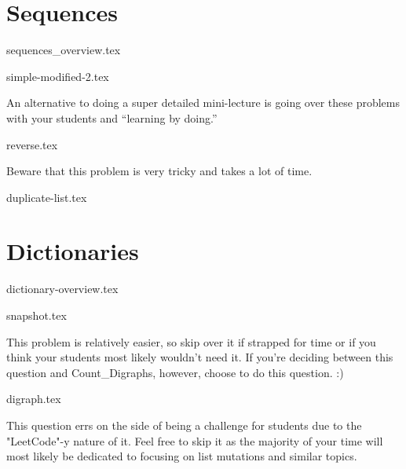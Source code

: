 \documentclass{exam}
\begin{document}
\section{Sequences}
{sequences_overview.tex}
\begin{questions}
    {simple-modified-2.tex}
    \begin{questionmeta}
        An alternative to doing a super detailed mini-lecture is going over these problems with your students and ``learning by doing.'' 
    \end{questionmeta}
    {reverse.tex}
    \begin{questionmeta}
        Beware that this problem is very tricky and takes a lot of time.
    \end{questionmeta}
    {duplicate-list.tex}
\end{questions}

\section{Dictionaries}
{dictionary-overview.tex}
\begin{questions}
    {snapshot.tex}
    \begin{questionmeta}
        This problem is relatively easier, so skip over it if strapped for time or if you think your students most likely wouldn't need it. 
        If you're deciding between this question and Count_Digraphs, however, choose to do this question. :)
    \end{questionmeta}
    {digraph.tex}
    \begin{questionmeta}
        This question errs on the side of being a challenge for students due to the "LeetCode"-y nature of it. Feel free to skip it as the majority of your time will most likely be dedicated to focusing on list mutations and similar topics.
    \end{questionmeta}
\end{questions}
\end{document}
